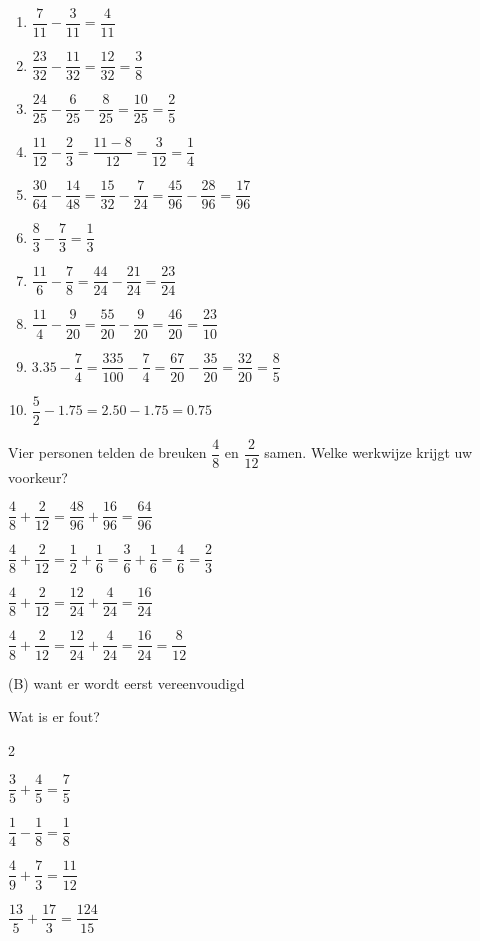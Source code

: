 \documentclass{bis}
\begin{document}
\begin{solution}
  \begin{enumerate}
    \item $\dfrac{7}{11}-\dfrac{3}{11}=\dfrac{4}{11}$
    \item $\dfrac{23}{32}-\dfrac{11}{32}=\dfrac{12}{32}=\dfrac{3}{8}$
    \item $\dfrac{24}{25}-\dfrac{6}{25}-\dfrac{8}{25}=\dfrac{10}{25}=\dfrac{2}{5}$
    \item $\dfrac{11}{12}-\dfrac{2}{3}=\dfrac{11-8}{12}=\dfrac{3}{12}=\dfrac{1}{4}$
    \item $\dfrac{30}{64}-\dfrac{14}{48}=\dfrac{15}{32}-\dfrac{7}{24}=\dfrac{45}{96}-\dfrac{28}{96}=\dfrac{17}{96}$
    \item $\dfrac{8}{3}-\dfrac{7}{3}=\dfrac{1}{3}$
    \item $\dfrac{11}{6}-\dfrac{7}{8}=\dfrac{44}{24}-\dfrac{21}{24}=\dfrac{23}{24}$
    \item $\dfrac{11}{4}-\dfrac{9}{20}=\dfrac{55}{20}-\dfrac{9}{20}=\dfrac{46}{20}=\dfrac{23}{10}$
    \item $3.35-\dfrac{7}{4}=\dfrac{335}{100}-\dfrac{7}{4}=\dfrac{67}{20}-\dfrac{35}{20}=\dfrac{32}{20}=\dfrac{8}{5}$
    \item $\dfrac{5}{2}-1.75=2.50-1.75=0.75$
  \end{enumerate}
\end{solution}

\begin{exercise}
Vier personen telden de breuken $\dfrac{4}{8}$ en $\dfrac{2}{12}$ samen. Welke werkwijze krijgt uw voorkeur?
\begin{meerkeuze}
  \item $\dfrac{4}{8}+\dfrac{2}{12}=\dfrac{48}{96}+\dfrac{16}{96}=\dfrac{64}{96}$
  \item $\dfrac{4}{8}+\dfrac{2}{12}=\dfrac{1}{2}+\dfrac{1}{6}=\dfrac{3}{6}+\dfrac{1}{6}=\dfrac{4}{6}=\dfrac{2}{3}$
  \item $\dfrac{4}{8}+\dfrac{2}{12}=\dfrac{12}{24}+\dfrac{4}{24}=\dfrac{16}{24}$
  \item $\dfrac{4}{8}+\dfrac{2}{12}=\dfrac{12}{24}+\dfrac{4}{24}=\dfrac{16}{24}=\dfrac{8}{12}$
\end{meerkeuze}
\end{exercise}

\begin{solution}
(B) want er wordt eerst vereenvoudigd
\end{solution}

\begin{exercise}
Wat is er fout?
\begin{multicols}{2}
\begin{meerkeuze}
  \item $\dfrac{3}{5}+\dfrac{4}{5}=\dfrac{7}{5}$
  \item $\dfrac{1}{4}-\dfrac{1}{8}=\dfrac{1}{8}$
  \item $\dfrac{4}{9}+\dfrac{7}{3}=\dfrac{11}{12}$
  \item $\dfrac{13}{5}+\dfrac{17}{3}=\dfrac{124}{15}$
\end{meerkeuze}
\end{multicols}
\end{exercise}
\end{document}
